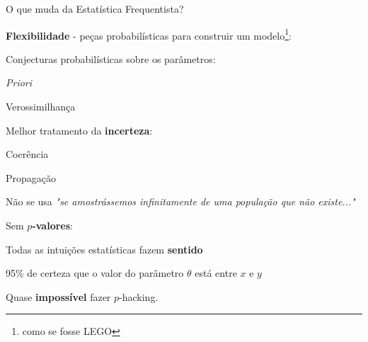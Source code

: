 \documentclass[aspectratio=169]{beamer}                    %
\begin{document}
\begin{frame}{O que muda da Estatística Frequentista?}
    \begin{vfilleditems}
        \item \textbf{Flexibilidade} - peças probabilísticas para construir um modelo\footnote{como se fosse LEGO}:
            \begin{vfilleditems}
                \item Conjecturas probabilísticas sobre os parâmetros:
                \begin{vfilleditems}
                    \item \textit{Priori}
                    \item Verossimilhança
                \end{vfilleditems}
            \end{vfilleditems}
        \item Melhor tratamento da \textbf{incerteza}:
        \begin{vfilleditems}
            \item Coerência
            \item Propagação
            \item Não se usa \textit{"se amostrássemos infinitamente de uma população que não existe..."}
        \end{vfilleditems}
        \item Sem \textbf{$p$-valores}:
        \begin{vfilleditems}
            \item Todas as intuições estatísticas fazem \textbf{sentido}
            \item 95\% de certeza que o valor do parâmetro $\theta$ está entre $x$ e $y$
            \item Quase \textbf{impossível} fazer $p$-hacking.
        \end{vfilleditems}
\end{vfilleditems}
\end{frame}
\end{document}

